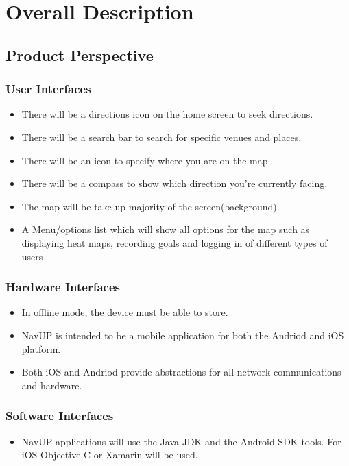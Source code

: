 \documentclass[runningheads,a4paper]{article}
\begin{document}
\section{Overall Description}

\subsection{Product Perspective}

\subsubsection{User Interfaces}
\begin{itemize}
	\item There will be a directions icon on the home screen to seek directions.
	\item There will be a search bar to search for specific venues and places.
	\item There will be an icon to specify where you are on the map.
	\item There will be a compass to show which direction you’re currently facing.
	\item The map will be take up majority of the screen(background).
	\item A Menu/options list which will show all options for the map such as displaying heat maps, recording goals and logging in of different types of users
	
\end{itemize}
\subsubsection{Hardware Interfaces}
\begin{itemize}
	\item In offline mode, the device must be able to store.
	\item NavUP is intended to be a mobile application for both the Andriod and iOS platform.
	\item Both iOS and Andriod provide abstractions for all network communications and hardware.
	
\end{itemize}
\subsubsection{Software Interfaces}
\begin{itemize}
	\item NavUP applications will use the Java JDK and the Android SDK tools. For iOS Objective-C or Xamarin will be used.
	
\end{itemize}
\end{document}

